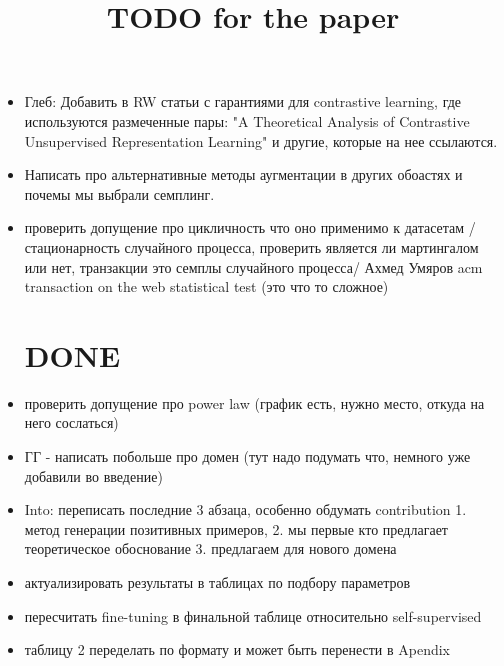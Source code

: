 \documentclass{article}
\title{TODO for the paper}
\author{}
\begin{document}
\maketitle

\begin{itemize}

\section{TODO}

\item Глеб: Добавить в RW статьи с гарантиями для contrastive learning, где используются размеченные пары: "A Theoretical Analysis of Contrastive Unsupervised Representation Learning" и другие, которые на нее ссылаются.

\item Написать про альтернативные методы аугментации в других обоастях и почемы мы выбрали семплинг.

\item проверить допущение про цикличность что оно применимо к датасетам / стационарность случайного процесса, проверить является ли мартингалом или нет, транзакции это семплы случайного процесса/ Ахмед Умяров  acm transaction on the web statistical test (это что то сложное)

\section{DONE}

\item проверить допущение про power law (график есть, нужно место, откуда на него сослаться)


\item ГГ - написать побольше про домен (тут надо подумать что, немного уже добавили во введение)


\item Into: переписать последние 3 абзаца, особенно обдумать contribution  1. метод генерации позитивных примеров, 2. мы первые кто предлагает теоретическое обоснование 3. предлагаем для нового домена 


\item актуализировать результаты в таблицах по подбору параметров

\item пересчитать fine-tuning в финальной таблице относительно self-supervised


\item таблицу 2 переделать по формату и может быть перенести в Apendix


\end{itemize}
\end{document}
